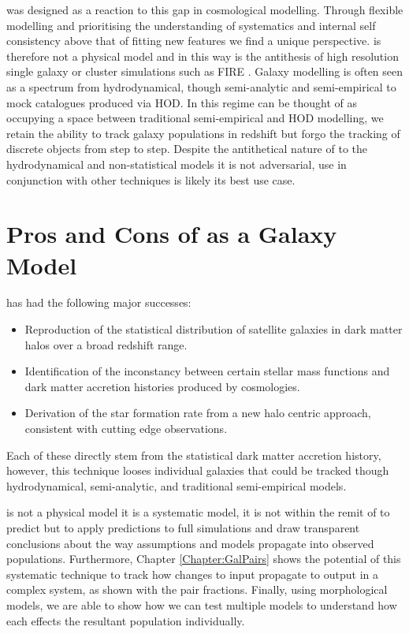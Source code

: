 \steel was designed as a reaction to this gap in cosmological modelling. Through flexible modelling and prioritising the understanding of systematics and internal self consistency above that of fitting new features we find a unique perspective. \steel is therefore not a physical model and in this way is the antithesis of high resolution single galaxy or cluster simulations such as FIRE \cite{Hopkins2018FIRE-2Formation}. Galaxy modelling is often seen as a spectrum from hydrodynamical, though semi-analytic and semi-empirical to mock catalogues produced via HOD. In this regime \steel can be thought of as occupying a space between traditional semi-empirical and HOD modelling, we retain the ability to track galaxy populations in redshift but forgo the tracking of discrete objects from step to step. Despite the antithetical nature of \steel to the hydrodynamical and non-statistical models it is not adversarial, use in conjunction with other techniques is likely its best use case. 

\section{Pros and Cons of \steel as a Galaxy Model}

\steel has had the following major successes:
\begin{itemize}
    \item Reproduction of the statistical distribution of satellite galaxies in dark matter halos over a broad redshift range.
    \item Identification of the inconstancy between certain stellar mass functions and dark matter accretion histories produced by \LCDM cosmologies.
    \item Derivation of the star formation rate from a new halo centric approach, consistent with cutting edge observations.
\end{itemize}
Each of these directly stem from the statistical dark matter accretion history, however, this technique looses individual galaxies that could be tracked though hydrodynamical, semi-analytic, and traditional semi-empirical models.

\steel is not a physical model it is a systematic model, it is not within the remit of \steel to predict but to apply predictions to full simulations and draw transparent conclusions about the way assumptions and models propagate into observed populations. Furthermore, Chapter \ref{Chapter:GalPairs} shows the potential of this systematic technique to track how changes to input propagate to output in a complex system, as shown with the pair fractions. Finally, using morphological models, we are able to show how we can test multiple models to understand how each effects the resultant population individually.

